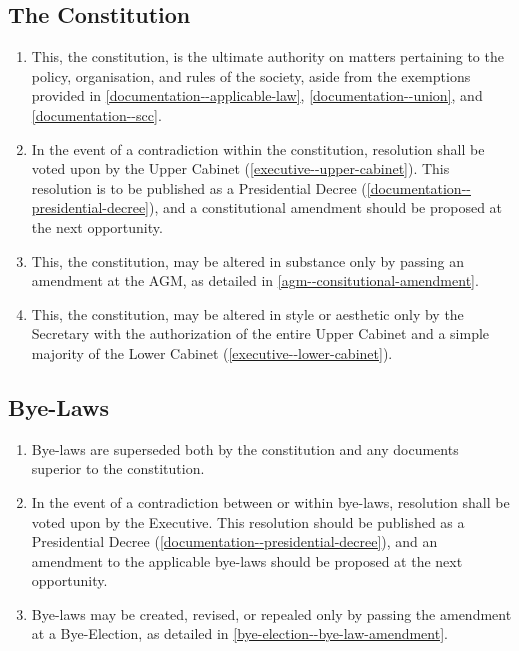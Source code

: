 \documentclass{scrartcl}
\begin{document}
        \subsection{The Constitution}
            \label{documentation--constitution}
            \begin{enumerate}
                \item This, the constitution, is the ultimate authority on matters pertaining to the policy, organisation, and rules of the society, aside from the exemptions provided in \ref{documentation--applicable-law}, \ref{documentation--union}, and \ref{documentation--scc}.
                \item In the event of a contradiction within the constitution, resolution shall be voted upon by the Upper Cabinet (\ref{executive--upper-cabinet}). This resolution is to be published as a Presidential Decree (\ref{documentation--presidential-decree}), and a constitutional amendment should be proposed at the next opportunity.
                \item This, the constitution, may be altered in substance only by passing an amendment at the AGM, as detailed in \ref{agm--consitutional-amendment}.
                \item This, the constitution, may be altered in style or aesthetic only by the Secretary with the authorization of the entire Upper Cabinet and a simple majority of the Lower Cabinet (\ref{executive--lower-cabinet}).
            \end{enumerate}

        \subsection{Bye-Laws}
            \label{documentation--bye-law}
            \begin{enumerate}
                \item Bye-laws are superseded both by the constitution and any documents superior to the constitution.
                \item In the event of a contradiction between or within bye-laws, resolution shall be voted upon by the Executive. This resolution should be published as a Presidential Decree (\ref{documentation--presidential-decree}), and an amendment to the applicable bye-laws should be proposed at the next opportunity.
                \item Bye-laws may be created, revised, or repealed only by passing the amendment at a Bye-Election, as detailed in \ref{bye-election--bye-law-amendment}.
            \end{enumerate}
\end{document}
